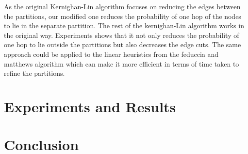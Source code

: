 \documentclass[letterpaper]{article}
\begin{document}
    As the original Kernighan-Lin algorithm focuses on reducing the edges between the partitions, our modified one reduces the probability of one hop of the nodes to lie in the separate partition. 
      The rest of the kernighan-Lin algorithm works in the original way. Experiments shows that it not only reduces the probability of one hop to lie outside the partitions but also decreases the edge cuts. The same approach could be applied to the linear heuristics from the feduccia and matthews 
algorithm\cite{23} which can make it more efficient in terms of time taken to refine the partitions.
 




\section{Experiments and Results}

\section{Conclusion}
 
\end{document}
